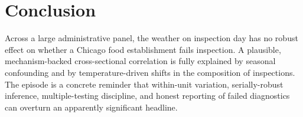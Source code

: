 \documentclass[11pt]{article}
\begin{document}
\section{Conclusion}
Across a large administrative panel, the weather on inspection day has no robust effect on
whether a Chicago food establishment fails inspection. A plausible, mechanism-backed
cross-sectional correlation is fully explained by seasonal confounding and by
temperature-driven shifts in the composition of inspections. The episode is a concrete
reminder that within-unit variation, serially-robust inference, multiple-testing discipline,
and honest reporting of failed diagnostics can overturn an apparently significant headline.
\end{document}
